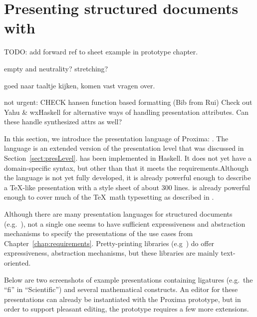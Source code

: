 \chapter{Presenting structured documents with {\Xprez}} \label{chap:presenting}



\bc
TODO:
add forward ref to sheet example in prototype chapter.



empty and neutrality? stretching?

goed naar taaltje kijken, komen vast vragen over.

not urgent:
CHECK hansen function based formatting (Bib from Rui)
Check out  Yahu & wxHaskell for alternative ways of handling presentation attributes. Can these handle synthesized attrs as well?
\ec








In this section, we introduce the presentation language of Proxima: {\Xprez}. The language is an extended version of the presentation level that was discussed in Section~\ref{sect:presLevel}. {\Xprez}  has been implemented in Haskell. \bc It does not yet have a domain-specific syntax, but other than that it meets the requirements.\ec Although the language is not yet fully developed, it \bc is already powerful enough to describe a \TeX -like presentation with a style sheet of about 300 lines. \ec
 is already powerful enough to cover much of the \TeX~math typesetting as described in \cite{heckmann97functionalTex}. 


Although there are many presentation languages for structured documents (e.g.~\cite{css2, badros99ccss, marden98psl, xsl10, quint97thot}), not a single one seems to have sufficient expressiveness and abstraction mechanisms to specify the presentations of the use cases from Chapter~\ref{chap:requirements}. Pretty-printing libraries (e.g~\cite{oppen80prettyPrinting, swierstra98combinators, hughes1995prettyPrinting, kahl99galleyCombs, brand96generationOfFormatters}) do offer expressiveness, abstraction mechanisms, but these libraries are mainly text-oriented. 

 
Below are two screenshots of example {\Xprez} presentations containing ligatures (e.g.\ the ``fi'' in ``Scientific'') and several mathematical constructs. An editor for these presentations can already be instantiated with the Proxima prototype, but in order to support pleasant editing, the prototype requires a few more extensions.

